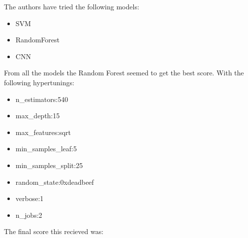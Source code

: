 \documentclass[../Main.tex]{subfiles}
\begin{document}
The authors have tried the following models:
\begin{itemize}
	\item SVM
	\item RandomForest
	\item CNN
\end{itemize}
From all the models the Random Forest seemed to get the best score. With the following hypertunings:\\
\begin{itemize}
	\item n\_estimators:540
	\item max\_depth:15
	\item max\_features:sqrt
	\item min\_samples\_leaf:5
	\item min\_samples\_split:25
	\item random\_state:0xdeadbeef
	\item verbose:1
	\item n\_jobs:2
\end{itemize}   
The final score this recieved was:
\end{document}

